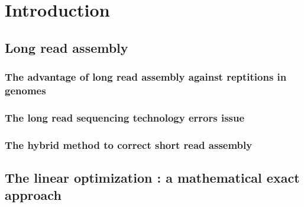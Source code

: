 \chapter{Introduction}

\section{Long read assembly}

\subsection{The advantage of long read assembly against reptitions in genomes}

\subsection{The long read sequencing technology errors issue}

\subsection{The hybrid method to correct short read assembly}

\section{The linear optimization : a mathematical exact approach}

\newpage